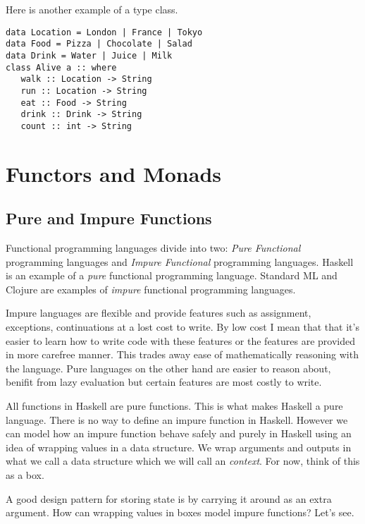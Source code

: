 Here is another example of a type class. 
\begin{lstlisting}
data Location = London | France | Tokyo
data Food = Pizza | Chocolate | Salad
data Drink = Water | Juice | Milk
class Alive a :: where
   walk :: Location -> String
   run :: Location -> String
   eat :: Food -> String
   drink :: Drink -> String
   count :: int -> String
\end{lstlisting}






\chapter{Functors and Monads}

\section{Pure and Impure Functions}

Functional programming languages divide into two: \textit{Pure Functional} programming languages 
and \textit{Impure Functional} programming languages. Haskell is an example of a \textit{pure} functional programming language. 
Standard ML and Clojure are examples of \textit{impure} functional programming languages.

Impure languages are flexible and provide features such as assignment, exceptions, 
continuations at a lost cost to write. By low cost I mean that that it's easier to learn how to write code with these features or the features are provided in more carefree manner. 
This trades away ease of mathematically reasoning with the language.
Pure languages on the other hand are easier to reason about, benifit from lazy evaluation
but certain features are most costly to write.


All functions in Haskell are pure functions. This is what makes Haskell a pure language.
There is no way to define an impure function in Haskell.
However we can model how an impure function behave safely and purely in Haskell
using an idea of {wrapping values} in a data structure. 
We wrap arguments and outputs in what we call a data structure which we will call an
 \textit{context}. For now, think of this as a box.

A good design pattern for storing state is by carrying it around as an extra 
argument.
How can wrapping values in boxes model impure functions? Let's see.



